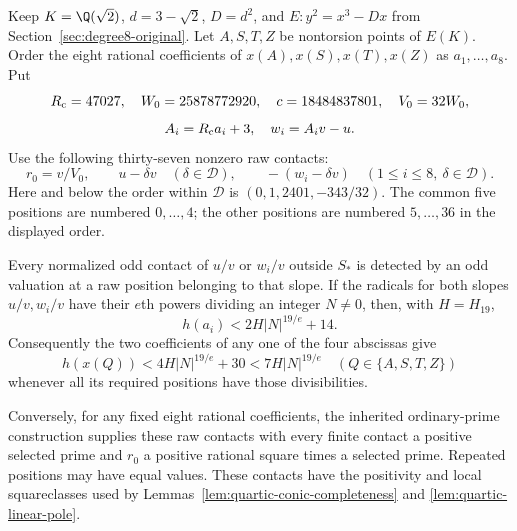 \begin{lemma}
\label{lem:quartic-rational37}
Keep $K=\Q(\sqrt2)$, $d=3-\sqrt2$, $D=d^2$, and
$E:y^2=x^3-Dx$ from Section~\ref{sec:degree8-original}.
Let $A,S,T,Z$ be nontorsion points of $E(K)$.
Order the eight rational coefficients of
$x(A),x(S),x(T),x(Z)$ as $a_1,\ldots,a_8$. Put
\[
 R_{\rm c}=47027,\quad W_0=25878772920,\quad c=18484837801,
 \quad V_0=32W_0,
\]
\[
 A_i=R_{\rm c}a_i+3,\quad w_i=A_iv-u.
\]
Use the following thirty-seven nonzero raw contacts:
\begin{equation}\label{eq:quartic-contacts37}
 r_0=v/V_0,\qquad u-\delta v\quad(\delta\in\mathcal D),
 \qquad -(w_i-\delta v)\quad(1\le i\le8,\ \delta\in\mathcal D).
\end{equation}
Here and below the order within $\mathcal D$ is
$(0,1,2401,-343/32)$. The common five positions are numbered $0,\ldots,4$;
the other positions are numbered $5,\ldots,36$ in the displayed order.

Every normalized odd contact of $u/v$ or $w_i/v$ outside $S_*$ is
detected by an odd valuation at a raw position belonging to that slope.
If the radicals for both slopes $u/v,w_i/v$ have their $e$th powers
dividing an integer $N\ne0$, then, with $H=H_{19}$,
\[
 h(a_i)<2H|N|^{19/e}+14.
\]
Consequently the two coefficients of any one of the four abscissas give
\begin{equation}\label{eq:quartic-direct-height}
 h(x(Q))<4H|N|^{19/e}+30<7H|N|^{19/e}
 \quad(Q\in\{A,S,T,Z\})
\end{equation}
whenever all its required positions have those divisibilities.

Conversely, for any fixed eight rational coefficients, the inherited
ordinary-prime construction supplies these raw contacts with every finite
contact a positive selected prime and $r_0$ a positive rational square
times a selected prime. Repeated positions may have equal values.
These contacts have the positivity and local squareclasses used by Lemmas~\ref{lem:quartic-conic-completeness} and \ref{lem:quartic-linear-pole}.
\end{lemma}

